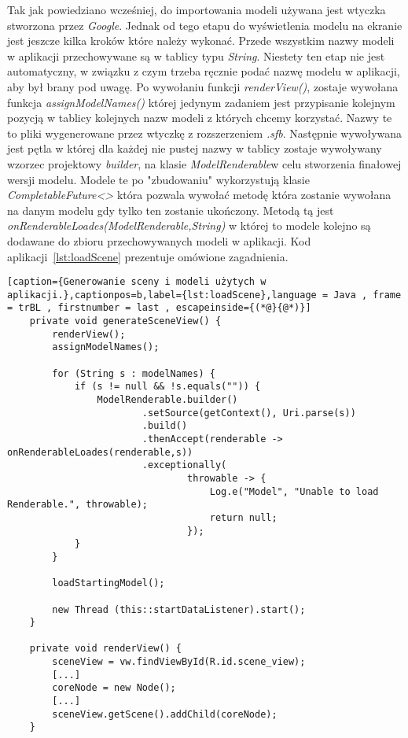 Tak jak powiedziano wcześniej, do importowania modeli używana jest wtyczka stworzona przez \textit{Google}. Jednak od tego etapu do wyświetlenia modelu na ekranie jest jeszcze kilka kroków które należy wykonać. Przede wszystkim nazwy modeli w aplikacji przechowywane są w tablicy typu \textit{String}. Niestety ten etap nie jest automatyczny, w związku z czym trzeba ręcznie podać nazwę modelu w aplikacji, aby był brany pod uwagę. Po wywołaniu funkcji \textit{renderView()}, zostaje wywołana funkcja \textit{assignModelNames()} której jedynym zadaniem jest przypisanie kolejnym pozycją w tablicy kolejnych nazw modeli z których chcemy korzystać. Nazwy te to pliki wygenerowane przez wtyczkę z rozszerzeniem \textit{.sfb}. Następnie wywoływana jest pętla w której dla każdej nie pustej nazwy w tablicy zostaje wywoływany wzorzec projektowy \textit{builder}, na klasie \textit{ModelRenderable}w celu stworzenia finałowej wersji modelu. Modele te po "zbudowaniu" wykorzystują klasie \textit{CompletableFuture<>} która pozwala wywołać metodę która zostanie wywołana na danym modelu gdy tylko ten zostanie ukończony. Metodą tą jest \textit{onRenderableLoades(ModelRenderable,String)} w której to modele kolejno są dodawane do zbioru przechowywanych modeli w aplikacji. Kod aplikacji~\ref{lst:loadScene} prezentuje omówione zagadnienia.
\begin{lstlisting}[caption={Generowanie sceny i modeli użytych w aplikacji.},captionpos=b,label={lst:loadScene},language = Java , frame = trBL , firstnumber = last , escapeinside={(*@}{@*)}]     
 	private void generateSceneView() {
        renderView();
        assignModelNames();

        for (String s : modelNames) {
            if (s != null && !s.equals("")) {
                ModelRenderable.builder()
                        .setSource(getContext(), Uri.parse(s))
                        .build()
                        .thenAccept(renderable -> onRenderableLoades(renderable,s))
                        .exceptionally(
                                throwable -> {
                                    Log.e("Model", "Unable to load Renderable.", throwable);
                                    return null;
                                });
            }
        }

        loadStartingModel();

        new Thread (this::startDataListener).start();
    }

    private void renderView() {
        sceneView = vw.findViewById(R.id.scene_view);
        [...]
        coreNode = new Node();
		[...]
        sceneView.getScene().addChild(coreNode);
    }                                             
\end{lstlisting}
